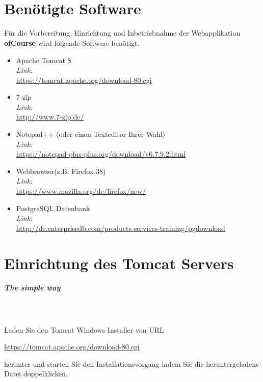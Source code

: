 \documentclass[a4paper, 12pt]{scrreprt}
\begin{document}
\begin{titlepage}
\begin{center}
        \ \\
        \ \\
       
        
        
    \end{center}
\end{titlepage}


\tableofcontents
\chapter{Benötigte Software}
Für die Vorbereitung, Einrichtung und Inbetriebnahme der Webapplikation \textbf{ofCourse} wird folgende Software benötigt.
\begin{itemize}
	\item Apache Tomcat 8\\
	{\it Link:\\} \url{https://tomcat.apache.org/download-80.cgi}
	\item 7-zip\\
	{\it Link:\\} \url{http://www.7-zip.de/}
	\item Notepad++ (oder einen Texteditor Ihrer Wahl)\\
	{\it Link:\\} \url{https://notepad-plus-plus.org/download/v6.7.9.2.html}
	\item Webbrowser(z.B. Firefox 38)\\
	{\it Link:\\} \url{https://www.mozilla.org/de/firefox/new/}
	\item PostgreSQL Datenbank\\
	{\it Link:\\} \url{http://de.enterprisedb.com/products-services-training/pgdownload}
\end{itemize}
\chapter{Einrichtung des Tomcat Servers}
\paragraph{The simple way}\ \\
\ \\
Laden Sie den Tomcat Windows Installer von URL 
\begin{center}
	\url{https://tomcat.apache.org/download-80.cgi}
\end{center}
herunter und starten Sie den Installationsvorgang indem Sie die heruntergeladene Datei doppelklicken.
\end{document}
